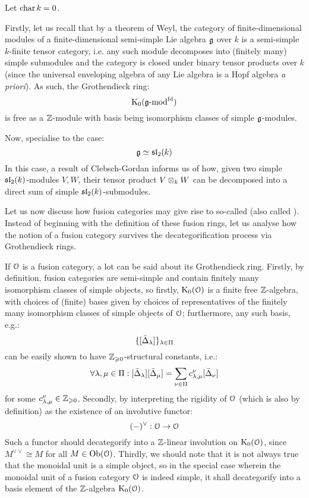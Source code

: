             \begin{example} \label{example: clebsch_gordan}
                Let $\chara k = 0$.
                
                Firstly, let us recall that by a theorem of Weyl, the category of finite-dimensional modules of a finite-dimensional semi-simple Lie algebra $\g$ over $k$ is a semi-simple $k$-finite tensor category, i.e. any such module decomposes into (finitely many) simple submodules and the category is closed under binary tensor products over $k$ (since the universal enveloping algebra of any Lie algebra is a Hopf algebra \textit{a priori}). As such, the Grothendieck ring:
                    $$\K_0(\g\mod^{\fd})$$
                is free as a $\Z$-module with basis being isomorphism classes of simple $\g$-modules. 

                Now, specialise to the case:
                    $$\g \cong \sl_2(k)$$
                In this case, a result of Clebsch-Gordan informs us of how, given two simple $\sl_2(k)$-modules $V, W$, their tensor product $V \tensor_k W$ can be decomposed into a direct sum of simple $\sl_2(k)$-submodules. 

            \end{example}
            
            Let us now discuss how fusion categories may give rise to so-called  (also called ). Instead of beginning with the definition of these fusion rings, let us analyse how the notion of a fusion category survives the decategorification process via Grothendieck rings. 
            
            If $\calO$ is a fusion category, a lot can be said about its Grothendieck ring. Firstly, by definition, fusion categories are semi-simple and contain finitely many isomorphism classes of simple objects, so firstly, $\K_0(\calO)$ is a finite free $\Z$-algebra, with choices of (finite) bases given by choices of representatives of the finitely many isomorphism classes of simple objects of $\calO$; furthermore, any such basis, e.g.:
                $$\{[\simple_{\lambda}]\}_{\lambda \in \Pi}$$
            can be easily shown to have $\Z_{\geq 0}$-structural constants, i.e.:
                $$\forall \lambda, \mu \in \Pi: [\simple_{\lambda}] [\simple_{\mu}] = \sum_{\nu \in \Pi} c_{\lambda, \mu}^{\nu} [\simple_{\nu}]$$
            for some $c_{\lambda, \mu}^{\nu} \in \Z_{\geq 0}$. Secondly, by interpreting the rigidity of $\calO$ (which is also by definition) as the existence of an involutive functor:
                $$(-)^{\vee}: \calO \to \calO$$
            Such a functor should decategorify into a $\Z$-linear involution on $\K_0(\calO)$, since $M^{\vee \vee} \cong M$ for all $M \in \Ob(\calO)$. Thirdly, we should note that it is not always true that the monoidal unit is a simple object, so in the special case wherein the monoidal unit of a fusion category $\calO$ is indeed simple, it shall decategorify into a basis element of the $\Z$-algebra $\K_0(\calO)$. 

